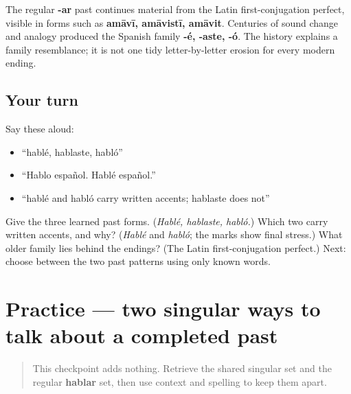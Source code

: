 \begin{cousinweb}
The regular \textbf{-ar} past continues material from the Latin first-conjugation perfect, visible in forms such as \textbf{amāvī, amāvistī, amāvit}. Centuries of sound change and analogy produced the Spanish family \textbf{-é, -aste, -ó}. The history explains a family resemblance; it is not one tidy letter-by-letter erosion for every modern ending.
\end{cousinweb}

\subsection*{Your turn}
Say these aloud:

\begin{itemize}
\raggedright
  \item “hablé, hablaste, habló”
  \item “Hablo español. Hablé español.”
  \item “hablé and habló carry written accents; hablaste does not”
\end{itemize}

\begin{tcolorbox}[breakable,colback=teal!4,colframe=teal!35!black,title={Before you move on}]
Give the three learned past forms. (\emph{Hablé, hablaste, habló.}) Which two carry written accents, and why? (\emph{Hablé} and \emph{habló}; the marks show final stress.) What older family lies behind the endings? (The Latin first-conjugation perfect.) Next: choose between the two past patterns using only known words.
\end{tcolorbox}
\section[Practice]{Practice — two singular ways to talk about a completed past}

\label{lesson:ES-C14-practice}



\begin{quote}
This checkpoint adds nothing. Retrieve the shared singular set and the regular \textbf{hablar} set, then use context and spelling to keep them apart.
\end{quote}

